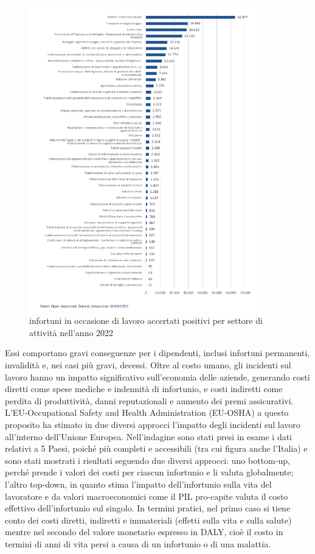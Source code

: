 \begin{figure}[htbp]
    \centering
    \includegraphics[width=0.9\textwidth]{figures/infortuni_industria_e_servizi.png}
    \caption{infortuni in occasione di lavoro accertati positivi per settore di attività nell'anno 2022}
    \label{fig:inforsplit}
\end{figure}

\noindent Essi comportano gravi conseguenze per i dipendenti, inclusi infortuni permanenti, invalidità e, nei casi più gravi, decessi. Oltre al costo umano, gli incidenti sul lavoro hanno un impatto significativo sull'economia delle aziende, generando costi diretti come spese mediche e indennità di infortunio, e costi indiretti come perdita di produttività, danni reputazionali e aumento dei premi assicurativi. L'EU-Occupational Safety and Health Administration (EU-OSHA) a questo proposito ha stimato in due diversi approcci l'impatto degli incidenti sul lavoro all'interno dell'Unione Europea\cite{a2osha-eu}. Nell'indagine sono stati presi in esame i dati relativi a 5 Paesi, poiché più completi e accessibili (tra cui figura anche l'Italia) e sono stati mostrati i risultati seguendo due diversi approcci: uno bottom-up, perché prende i valori dei costi per ciascun infortunio e li valuta globalmente; l'altro top-down, in quanto stima l'impatto dell'infortunio sulla vita del lavoratore e da valori macroeconomici come il PIL pro-capite valuta il costo effettivo dell'infortunio sul singolo. In termini pratici, nel primo caso si tiene conto dei costi diretti, indiretti e immateriali (effetti sulla vita e sulla salute) mentre nel secondo del valore monetario espresso in DALY, cioè il costo in termini di anni di vita persi a causa di un infortunio o di una malattia.

